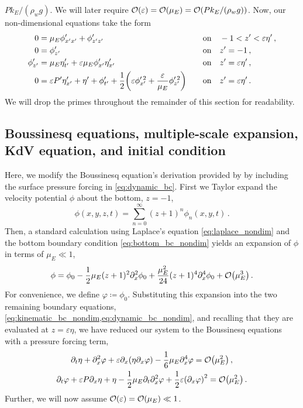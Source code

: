 \documentclass{jfm}
\renewcommand*{\epsilon}{\varepsilon}
\begin{document}
$P k_E/(\rho_w g)$.
We will later require $\order{\epsilon} = \order{\mu_E} =
\order{Pk_E/(\rho_w g)}$.
Now, our non-dimensional equations take the form
\begin{alignat}{2}
  0 &= \mu_E \phi'_{x'x'} + \phi'_{z'z'} &&\qq{on}
    -1 < z' < \epsilon \eta' \,, \label{eq:laplace_nondim} \\
  0 &= \phi'_{z'} &&\qq{on} z'=-1 \,, \label{eq:bottom_bc_nondim} \\
  \phi'_{z'} &= \mu_E \eta'_{t'} +
    \epsilon \mu_E \phi'_{x'} \eta'_{x'} &&\qq{on} z' = \epsilon \eta' \,,
    \label{eq:kinematic_bc_nondim} \\
  0 &= \epsilon P' \eta'_{x'} +  \eta' + \phi'_{t'} + \frac{1}{2}
    \pqty{\epsilon \phi_{x'}^{\prime \, 2} + \frac{\epsilon}{\mu_E}
    \phi_{z'}^{\prime \, 2}} &&\qq{on} z'= \epsilon \eta' \,.
    \label{eq:dynamic_bc_nondim}
\end{alignat}
We will drop the primes throughout the remainder of this section for readability.

\subsection{Boussinesq equations, multiple-scale expansion, KdV equation,
and initial condition}
Here, we modify the Boussinesq equation's derivation provided by
\citet{mei2005nonlinear} by including the surface pressure forcing in
\cref{eq:dynamic_bc}.
First we Taylor expand the velocity potential $\phi$ about the bottom,
$z=-1$,
\begin{equation}
  \phi(x,y,z,t) = \sum_{n=0}^\infty (z+1)^n\phi_n(x,y,t) \,.
\end{equation}
Then, a standard calculation \citep[\eg][]{mei2005nonlinear} using
Laplace's equation \cref{eq:laplace_nondim} and the bottom boundary
condition \cref{eq:bottom_bc_nondim} yields an expansion of $\phi$ in
terms of $\mu_E \ll 1$,
\begin{equation}
  \phi = \phi_0 - \frac{1}{2}\mu_E (z+1)^2\partial^2_x\phi_0 +
  \frac{\mu_E^2}{24}(z+1)^4\partial^4_x\phi_0 +
  \order{\mu_E^3} \,.
\end{equation}
For convenience, we define $\varphi \coloneqq \phi_0$.
Substituting this expansion into the two remaining boundary equations,
\cref{eq:kinematic_bc_nondim,eq:dynamic_bc_nondim}, and recalling that
they are evaluated at $z=\epsilon \eta$, we have reduced our system to
the Boussinesq equations with a pressure forcing term,
\begin{gather}
  \partial_t \eta + \partial_x^2 \varphi + \epsilon \partial_x
    \pqty{\eta \partial_x \varphi} -\frac{1}{6}\mu_E \partial^4_x
    \varphi = \order{\mu_E^2} \label{eq:kinematic_bc_varphi} \,, \\
  \partial_t \varphi + \epsilon P \partial_x \eta + \eta -
    \frac{1}{2}\mu_E \partial_t \partial_x^2 \varphi +
    \frac{1}{2}\epsilon\pqty{\partial_x \varphi}^2 = \order{\mu_E^2} \,.
    \label{eq:dynamic_bc_varphi}
\end{gather}
Further, we will now assume $\order{\epsilon} = \order{\mu_E} \ll 1$.
\end{document}
